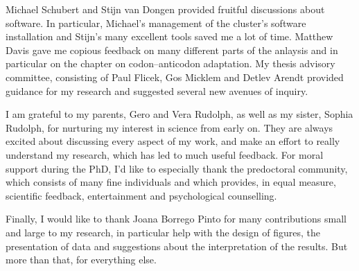 Michael Schubert and Stĳn van Dongen provided fruitful discussions about
software. In particular, Michael’s management of the cluster’s software
installation and Stĳn’s many excellent tools saved me a lot of time. Matthew
Davis gave me copious feedback on many different parts of the anlaysis and in
particular on the chapter on codon--anticodon adaptation. My thesis advisory
committee, consisting of Paul Flicek, Gos Micklem and Detlev Arendt provided
guidance for my research and suggested several new avenues of inquiry.

I am grateful to my parents, Gero and Vera Rudolph, as well as my sister, Sophia
Rudolph, for nurturing my interest in science from early on. They are always
excited about discussing every aspect of my work, and make an effort to really
understand my research, which has led to much useful feedback. For moral support
during the PhD, I’d like to especially thank the  predoctoral
community, which consists of many fine individuals and which provides, in equal
measure, scientific feedback, entertainment and psychological counselling.

Finally, I would like to thank Joana Borrego Pinto for many contributions small
and large to my research, in particular help with the design of figures, the
presentation of data and suggestions about the interpretation of the results.
But more than that, for everything else.
